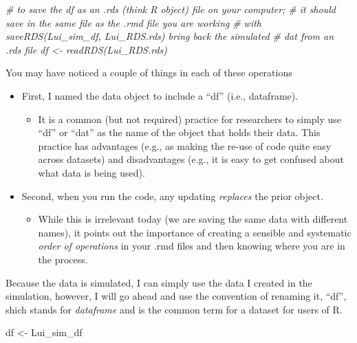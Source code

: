 \documentclass[
  11pt,
]{book}
\newenvironment{Shaded}{\begin{snugshade}}{\end{snugshade}}
\newcommand{\CommentTok}[1]{\textcolor[rgb]{0.56,0.35,0.01}{\textit{#1}}}
\newcommand{\NormalTok}[1]{#1}
\newcommand{\OtherTok}[1]{\textcolor[rgb]{0.56,0.35,0.01}{#1}}
\providecommand{\tightlist}{%
  \setlength{\itemsep}{0pt}\setlength{\parskip}{0pt}}
\begin{document}
\begin{Shaded}
\begin{Highlighting}[]
\CommentTok{\# to save the df as an .rds (think \textquotesingle{}R object\textquotesingle{}) file on your computer;}
\CommentTok{\# it should save in the same file as the .rmd file you are working}
\CommentTok{\# with saveRDS(Lui\_sim\_df, \textquotesingle{}Lui\_RDS.rds\textquotesingle{}) bring back the simulated}
\CommentTok{\# dat from an .rds file df \textless{}{-} readRDS(\textquotesingle{}Lui\_RDS.rds\textquotesingle{})}
\end{Highlighting}
\end{Shaded}

You may have noticed a couple of things in each of these operations

\begin{itemize}
\tightlist
\item
  First, I named the data object to include a ``df'' (i.e., dataframe).

  \begin{itemize}
  \tightlist
  \item
    It is a common (but not required) practice for researchers to simply use ``df'' or ``dat'' as the name of the object that holds their data. This practice has advantages (e.g., as making the re-use of code quite easy across datasets) and disadvantages (e.g., it is easy to get confused about what data is being used).
  \end{itemize}
\item
  Second, when you run the code, any updating \emph{replaces} the prior object.

  \begin{itemize}
  \tightlist
  \item
    While this is irrelevant today (we are saving the same data with different names), it points out the importance of creating a sensible and systematic \emph{order of operations} in your .rmd files and then knowing where you are in the process.
  \end{itemize}
\end{itemize}

Because the data is simulated, I can simply use the data I created in the simulation, however, I will go ahead and use the convention of renaming it, ``df'', shich stands for \emph{dataframe} and is the common term for a dataset for users of R.

\begin{Shaded}
\begin{Highlighting}[]
\NormalTok{df }\OtherTok{\textless{}{-}}\NormalTok{ Lui\_sim\_df}
\end{Highlighting}
\end{Shaded}
\end{document}
